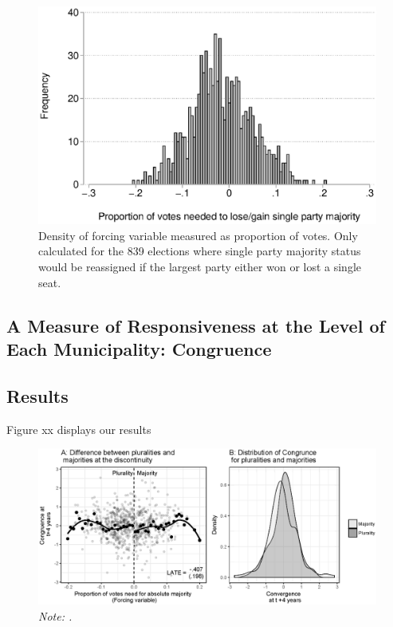 \documentclass[a4paper,12pt]{article}
\newcommand\fnote[1]{\captionsetup{font=small}\caption*{#1}}
\begin{document}
\begin{figure}[htbp] 
	\centering

	\includegraphics[width=1\textwidth]{distpct.eps}
	\caption{Density of forcing variable measured as proportion of votes. Only calculated for the 839 elections where single party majority status would be reassigned if the largest party either won or lost a single seat.}
	\label{figure:forcing}
\end{figure}

\subsection{A Measure of Responsiveness at the Level of Each Municipality: Congruence}

\subsection{Results}

Figure xx displays our results

\begin{landscape}
	\begin{figure}[h]
		\centering
		\includegraphics[scale = 1]{rddCongruence.eps}
		\caption{\textbf{.}} \fnote{\emph{Note: .}}
		\label{fig:PermTest}
	\end{figure}
\end{landscape}
	
\end{document}
